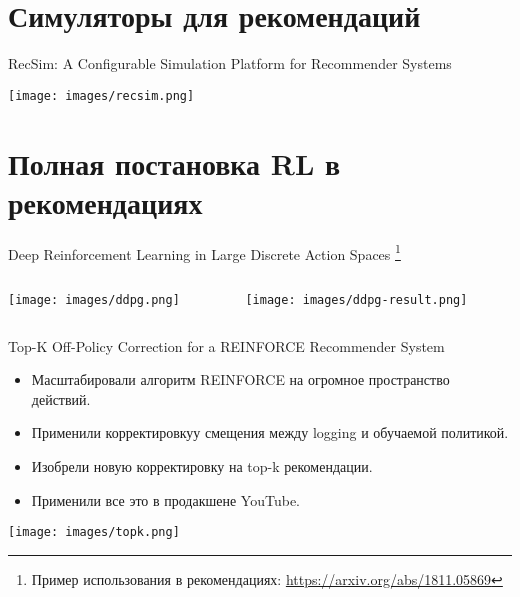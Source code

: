 \documentclass[11pt,aspectratio=169,handout]{beamer}
\begin{document}
\section{Симуляторы для рекомендаций}

\begin{frame}{RecSim: A Configurable Simulation Platform for Recommender Systems \cite{RECSIM}}

\begin{center}
\texttt{[image: images/recsim.png]}
\end{center}

\end{frame}

\section{Полная постановка RL в рекомендациях}

\begin{frame}{Deep Reinforcement Learning in Large Discrete Action Spaces \cite{DDPG}\footnote{Пример использования в рекомендациях: \url{https://arxiv.org/abs/1811.05869}}}

\begin{columns}
\begin{column}{0.4\textwidth}
\begin{center}
\texttt{[image: images/ddpg.png]}
\end{center}
\end{column}

\begin{column}{0.5\textwidth}
\begin{center}
\texttt{[image: images/ddpg-result.png]}
\end{center}
\end{column}
\end{columns}

\end{frame}

\begin{frame}{Top-K Off-Policy Correction for a REINFORCE Recommender System
 \cite{TOPK}}
 
\begin{itemize}
\item Масштабировали алгоритм REINFORCE на огромное пространство действий.
\item Применили корректировкуу смещения между logging и обучаемой политикой.
\item Изобрели новую корректировку на top-k рекомендации.
\item Применили все это в продакшене YouTube.
\end{itemize}

\begin{center}
\texttt{[image: images/topk.png]}
\end{center}

\end{frame}
\end{document}
